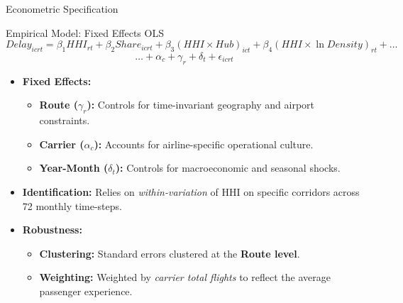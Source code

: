 \documentclass[t]{beamer}
\begin{document}
\begin{frame}{Econometric Specification}
    \begin{block}{Empirical Model: Fixed Effects OLS}
        \footnotesize
        \[ Delay_{icrt} = \beta_1 HHI_{rt} + \beta_2 Share_{icrt} + \beta_3 (HHI \times Hub)_{ict} + \beta_4 (HHI \times \ln Density)_{rt} + \dots \]
        \[ \dots + \alpha_c + \gamma_r + \delta_t + \epsilon_{icrt} \]
    \end{block}

    \begin{itemize}
        \item \textbf{Fixed Effects:}
        \begin{itemize}
            \item \textbf{Route ($\gamma_r$):} Controls for time-invariant geography and airport constraints.
            \item \textbf{Carrier ($\alpha_c$):} Accounts for airline-specific operational culture.
            \item \textbf{Year-Month ($\delta_t$):} Controls for macroeconomic and seasonal shocks.
        \end{itemize}
        \addlinespace
        \item \textbf{Identification:} Relies on \textit{within-variation} of HHI on specific corridors across 72 monthly time-steps.
        \item \textbf{Robustness:}
        \begin{itemize}
            \item \textbf{Clustering:} Standard errors clustered at the \textbf{Route level}.
            \item \textbf{Weighting:} Weighted by \textit{carrier total flights} to reflect the average passenger experience.
        \end{itemize}
    \end{itemize}
\end{frame}
\end{document}
